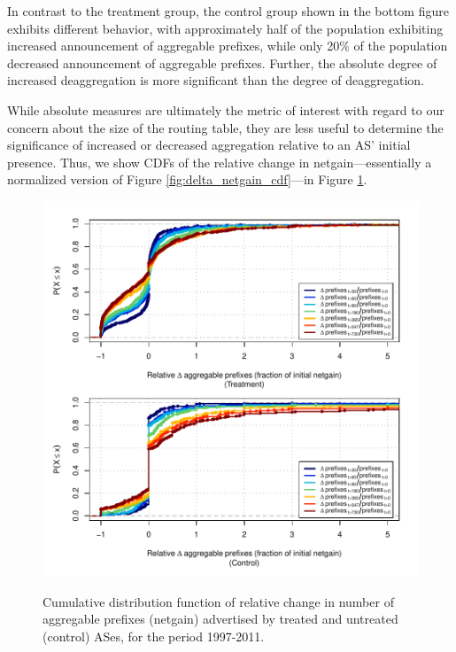 In contrast to the treatment group, the control group shown in the bottom
figure exhibits different behavior, with approximately half of the population
exhibiting increased announcement of aggregable prefixes, while only 20\% of
the population decreased announcement of aggregable prefixes. Further, the
absolute degree of increased deaggregation is more significant than the degree
of deaggregation.

While absolute measures are ultimately the metric of interest with regard to
our concern about the size of the routing table, they are less useful to
determine the significance of increased or decreased aggregation relative to
an AS' initial presence. Thus, we show CDFs of the relative change in
netgain---essentially a normalized version of Figure
\ref{fig:delta_netgain_cdf}---in Figure \ref{fig:delta_rel_netgain_cdf}.

\begin{figure}[h!]
\begin{centering}
\begin{singlespace}
\includegraphics[width=6in]{figures/behavior-rel_netgain-1997_2011-corr.pdf}
    \vspace{-2em}\\
    \caption{Cumulative distribution function of relative change in number of
    aggregable prefixes (netgain) advertised by treated and untreated (control)
    ASes, for the period 1997-2011.}
    \label{fig:delta_rel_netgain_cdf}
\end{singlespace}
\end{centering}
\end{figure}

